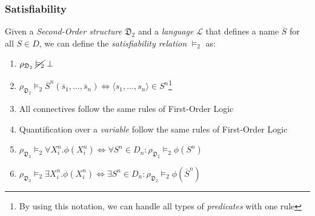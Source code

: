 \documentclass{beamer}
\begin{document}
                \begin{frame}
                    \frametitle{Satisfiability}
                    \begin{definition}
                        Given a \textit{Second-Order structure} $ \mathfrak{D}_2 $ and a \textit{language} $ \mathcal{L} $ that defines a name $ \overline{S} $ for all $ S \in D $, we can define the \textit{satisfiability relation} $ \vDash_2 $ as:
                        \begin{enumerate}
                            \item $ \rho_{\mathfrak{D}_2}\; \cancel{\vDash_2}\; \bot $
                            \item $ \rho_{\mathfrak{D}_2} \vDash_2 \overline{S}^n(\overline{s}_1, \dots, \overline{s}_n) \Leftrightarrow \langle s_1, \dots, s_n \rangle \in S^n $\footnote{By using this notation, we can handle all types of \textit{predicates} with one rule}
                            \item All connectives follow the same rules of First-Order Logic
                            \item Quantification over a \textit{variable} follow the same rules of First-Order Logic
                            \item $ \rho_{\mathfrak{D}_2} \vDash_2 \forall X^n_i. \phi(X^n_i) \Leftrightarrow \forall S^n \in D_n: \rho_{\mathfrak{D}_2} \vDash_2 \phi(S^n) $
                            \item $ \rho_{\mathfrak{D}_2} \vDash_2 \exists X^n_i. \phi(X^n_i) \Leftrightarrow \exists S^n \in D_n: \rho_{\mathfrak{D}_2} \vDash_2 \phi(\overline{S}^n) $
                        \end{enumerate}
                    \end{definition}
                \end{frame}
                
\end{document}
